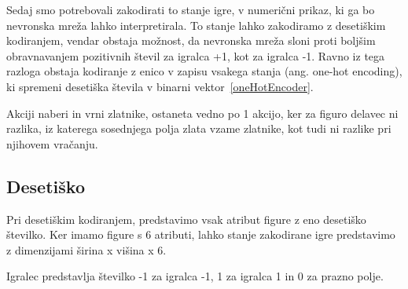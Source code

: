 \documentclass[a4paper, 12pt]{book}
\begin{document}
Sedaj smo potrebovali zakodirati to stanje igre, v numerični prikaz, ki ga bo nevronska mreža lahko interpretirala. 
To stanje lahko zakodiramo z desetiškim kodiranjem, vendar obstaja možnost, da nevronska mreža sloni proti boljšim obravnavanjem pozitivnih števil za igralca +1, kot za igralca -1. 
Ravno iz tega razloga obstaja kodiranje z enico v zapisu vsakega stanja (ang. one-hot encoding), ki spremeni desetiška števila v binarni vektor~\ref{oneHotEncoder}.

Akciji naberi in vrni zlatnike, ostaneta vedno po 1 akcijo, ker za figuro delavec ni razlika, iz katerega sosednjega polja zlata vzame zlatnike, kot tudi ni razlike pri njihovem vračanju.

\subsection{Desetiško}
Pri desetiškim kodiranjem, predstavimo vsak atribut figure z eno desetiško številko.
Ker imamo figure s 6 atributi, lahko stanje zakodirane igre predstavimo z dimenzijami širina x višina x 6.

Igralec predstavlja številko -1 za igralca -1, 1 za igralca 1 in 0 za prazno polje.
\end{document}
